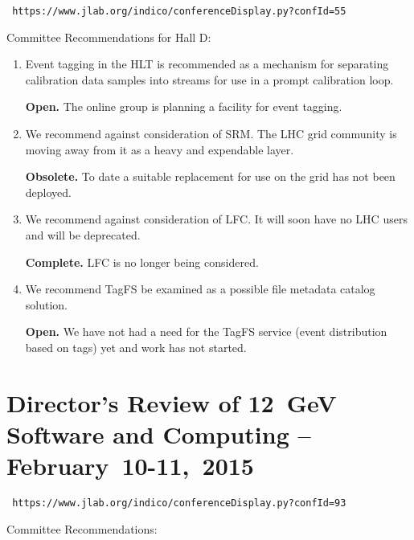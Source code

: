 \documentclass[12pt]{article}
\begin{document}
\begin{center}\tt
https://www.jlab.org/indico/conferenceDisplay.py?confId=55
\end{center}

Committee Recommendations for Hall D:

\begin{enumerate}

\item Event tagging in the HLT is recommended as a mechanism for
  separating calibration data samples into streams for use in a prompt
  calibration loop.

  {\bf Open.} The online group is planning a facility for event tagging.

\item We recommend against consideration of SRM. The LHC grid
  community is moving away from it as a heavy and expendable layer.

  {\bf Obsolete.} To date a suitable replacement for use on the grid
  has not been deployed.

\item We recommend against consideration of LFC. It will soon have no
  LHC users and will be deprecated.

  {\bf Complete.} LFC is no longer being considered.

\item We recommend TagFS be examined as a possible file metadata
  catalog solution.

  {\bf Open.} We have not had a need for the TagFS service (event
  distribution based on tags) yet and work has not started.

\end{enumerate}

\section{Director's Review of 12~GeV Software and Computing -- February~10-11,~2015}

\begin{center}\tt
https://www.jlab.org/indico/conferenceDisplay.py?confId=93
\end{center}

Committee Recommendations:
\end{document}

